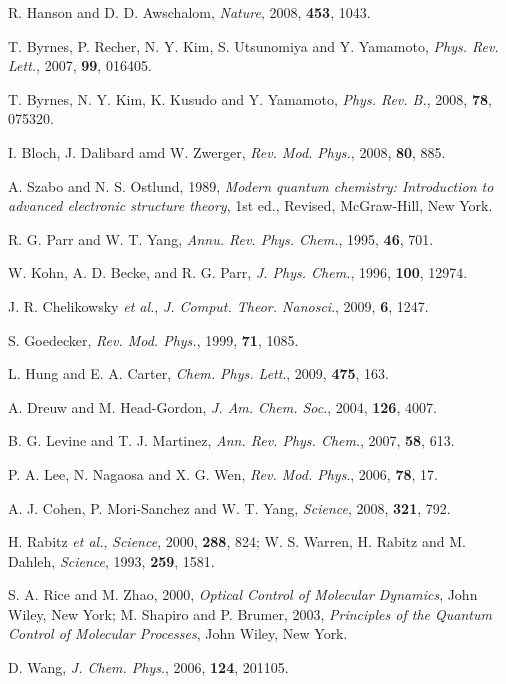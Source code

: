 \documentclass[8.5pt,twoside,twocolumn]{article}
\begin{document}
\begin{thebibliography}{99}
R. Hanson and D. D. Awschalom, \emph{Nature}, 2008, \textbf{453}, 1043.

T. Byrnes, P. Recher, N. Y. Kim, S. Utsunomiya and Y. Yamamoto, \emph{Phys. Rev. Lett.}, 2007, \textbf{99}, 016405.

T. Byrnes, N. Y. Kim, K. Kusudo and Y. Yamamoto, \emph{Phys. Rev. B.}, 2008, \textbf{78}, 075320.

I. Bloch, J. Dalibard amd W. Zwerger, \emph{Rev. Mod. Phys.}, 2008, \textbf{80}, 885.

A. Szabo and N. S. Ostlund, 1989,
\emph{Modern quantum chemistry:
Introduction to advanced electronic structure theory},
1st ed., Revised,
McGraw-Hill, New York.

R. G. Parr and W. T. Yang, \emph{Annu. Rev. Phys. Chem.},
1995, \textbf{46}, 701.

W. Kohn, A. D. Becke, and R. G. Parr, \emph{J. Phys. Chem.},
1996, \textbf{100}, 12974.

J. R. Chelikowsky  \emph{et al.}, \emph{J. Comput. Theor. Nanosci}., 2009, \textbf{6}, 1247.

S. Goedecker, \emph{Rev. Mod. Phys.}, 1999, \textbf{71}, 1085.

L. Hung and E. A. Carter, \emph{Chem. Phys. Lett}., 2009, \textbf{475}, 163.

A. Dreuw and M. Head-Gordon, \emph{J. Am. Chem. Soc}., 2004, \textbf{126}, 4007.

B. G. Levine and T. J. Martinez, \emph{Ann. Rev. Phys. Chem}., 2007, \textbf{58}, 613.

P. A. Lee, N. Nagaosa and X. G. Wen, \emph{Rev. Mod. Phys}., 2006, \textbf{78}, 17.

A. J. Cohen, P. Mori-Sanchez and W. T. Yang, \emph{Science},
2008, \textbf{321}, 792.

H. Rabitz \emph{et al.}, \emph{Science}, 2000, \textbf{288}, 824; W. S. Warren, H. Rabitz and M. Dahleh, \emph{Science}, 1993, \textbf{259}, 1581.

S. A. Rice and M. Zhao, 2000, \emph{Optical Control of Molecular
Dynamics}, John Wiley, New York; M. Shapiro and P. Brumer, 2003,  \emph{Principles of the Quantum Control of
Molecular Processes}, John Wiley, New York.

D. Wang, \emph{J. Chem. Phys}., 2006, \textbf{124}, 201105.


\end{thebibliography}
\end{document}
